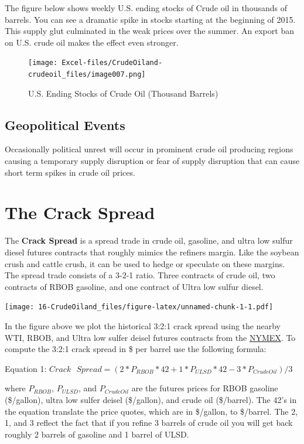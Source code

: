 \documentclass[
]{book}
\begin{document}
The figure below shows weekly U.S. ending stocks of Crude oil in thousands of barrels. You can see a dramatic spike in stocks starting at the beginning of 2015. This supply glut culminated in the weak prices over the summer. An export ban on U.S. crude oil makes the effect even stronger.

\begin{figure}
\centering
\texttt{[image: Excel-files/CrudeOiland-crudeoil\_files/image007.png]}
\caption{U.S. Ending Stocks of Crude Oil (Thousand Barrels)}
\end{figure}

\hypertarget{geopolitical-events}{%
\subsection{Geopolitical Events}\label{geopolitical-events}}

Occasionally political unrest will occur in prominent crude oil producing regions causing a temporary supply disruption or fear of supply disruption that can cause short term spikes in crude oil prices.

\hypertarget{the-crack-spread}{%
\section{The Crack Spread}\label{the-crack-spread}}

The \textbf{Crack Spread} is a spread trade in crude oil, gasoline, and ultra low sulfur diesel futures contracts that roughly mimics the refiners margin. Like the soybean crush and cattle crush, it can be used to hedge or speculate on these margins. The spread trade consists of a 3-2-1 ratio. Three contracts of crude oil, two contracts of RBOB gasoline, and one contract of Ultra low sulfur diesel.

\texttt{[image: 16-CrudeOiland\_files/figure-latex/unnamed-chunk-1-1.pdf]}

In the figure above we plot the historical 3:2:1 crack spread using the nearby WTI, RBOB, and Ultra low sulfer deisel futures contracts from the \href{www.NYMEX.com}{NYMEX}. To compute the 3:2:1 crack spread in \$ per barrel use the following formula:

Equation 1: \(Crack \text{ } Spread = (2*P_{RBOB}*42 + 1*P_{ULSD}*42 - 3*P_{CrudeOil})/3\)

where \(P_{RBOB}\), \(P_{ULSD}\), and \(P_{CrudeOil}\) are the futures prices for RBOB gasoline (\$/gallon), ultra low sulfer deisel (\$/gallon), and crude oil (\$/barrel). The 42's in the equation translate the price quotes, which are in \$/gallon, to \$/barrel. The 2, 1, and 3 reflect the fact that if you refine 3 barrels of crude oil you will get back roughly 2 barrels of gasoline and 1 barrel of ULSD.
\end{document}
